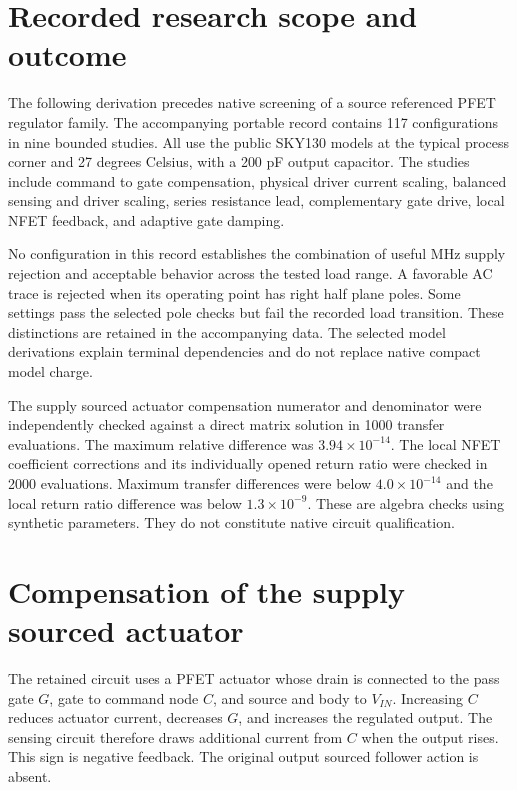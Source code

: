 \section{Recorded research scope and outcome}
The following derivation precedes native screening of a source referenced PFET regulator family. The accompanying portable record contains 117 configurations in nine bounded studies. All use the public SKY130 models at the typical process corner and 27 degrees Celsius, with a 200 pF output capacitor. The studies include command to gate compensation, physical driver current scaling, balanced sensing and driver scaling, series resistance lead, complementary gate drive, local NFET feedback, and adaptive gate damping.

No configuration in this record establishes the combination of useful MHz supply rejection and acceptable behavior across the tested load range. A favorable AC trace is rejected when its operating point has right half plane poles. Some settings pass the selected pole checks but fail the recorded load transition. These distinctions are retained in the accompanying data. The selected model derivations explain terminal dependencies and do not replace native compact model charge.

The supply sourced actuator compensation numerator and denominator were independently checked against a direct matrix solution in 1000 transfer evaluations. The maximum relative difference was $3.94\times10^{-14}$. The local NFET coefficient corrections and its individually opened return ratio were checked in 2000 evaluations. Maximum transfer differences were below $4.0\times10^{-14}$ and the local return ratio difference was below $1.3\times10^{-9}$. These are algebra checks using synthetic parameters. They do not constitute native circuit qualification.



\section{Compensation of the supply sourced actuator}
The retained circuit uses a PFET actuator whose drain is connected to the pass gate $G$, gate to command node $C$, and source and body to $V_{IN}$. Increasing $C$ reduces actuator current, decreases $G$, and increases the regulated output. The sensing circuit therefore draws additional current from $C$ when the output rises. This sign is negative feedback. The original output sourced follower action is absent.

